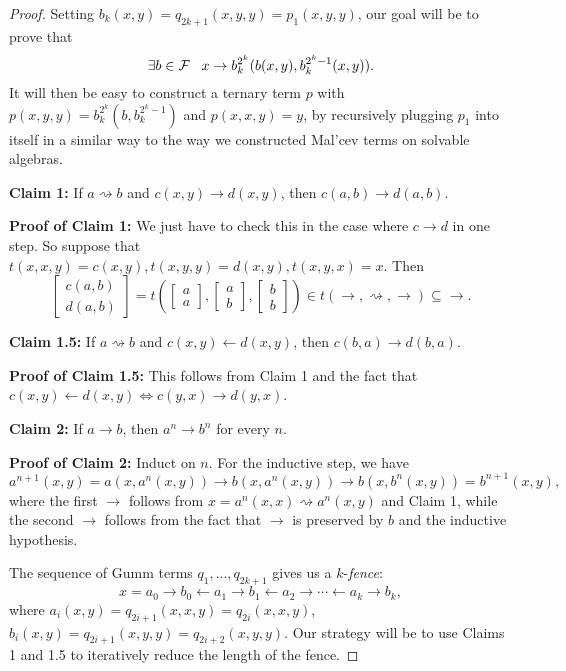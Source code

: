 \documentclass[letterpaper,11pt]{article}
\begin{document}
\begin{proof}
Setting $b_k(x,y) = q_{2k+1}(x,y,y) = p_1(x,y,y)$, our goal will be to prove that
\[
\exists b \in \mathcal{F}\;\;\; x \rightarrow b_k^{2^k}(b(x,y),b_k^{2^k-1}(x,y)).
\]
It will then be easy to construct a ternary term $p$ with $p(x,y,y) = b_k^{2^k}(b,b_k^{2^k-1})$ and $p(x,x,y) = y$, by recursively plugging $p_1$ into itself in a similar way to the way we constructed Mal'cev terms on solvable algebras.

{\bf Claim 1:} If $a \rightsquigarrow b$ and $c(x,y) \rightarrow d(x,y)$, then $c(a,b) \rightarrow d(a,b)$.

{\bf Proof of Claim 1:} We just have to check this in the case where $c \rightarrow d$ in one step. So suppose that $t(x,x,y) = c(x,y), t(x,y,y) = d(x,y), t(x,y,x) = x$. Then
\[
\begin{bmatrix} c(a,b)\\ d(a,b)\end{bmatrix} = t\left(\begin{bmatrix} a\\ a\end{bmatrix}, \begin{bmatrix} a\\ b\end{bmatrix}, \begin{bmatrix} b\\ b\end{bmatrix}\right) \in t(\rightarrow,\rightsquigarrow,\rightarrow) \subseteq \rightarrow.
\]

{\bf Claim 1.5:} If $a \rightsquigarrow b$ and $c(x,y) \leftarrow d(x,y)$, then $c(b,a) \rightarrow d(b,a)$.

{\bf Proof of Claim 1.5:} This follows from Claim 1 and the fact that $c(x,y) \leftarrow d(x,y) \iff c(y,x) \rightarrow d(y,x)$.

{\bf Claim 2:} If $a \rightarrow b$, then $a^n \rightarrow b^n$ for every $n$.

{\bf Proof of Claim 2:} Induct on $n$. For the inductive step, we have
\[
a^{n+1}(x,y) = a(x,a^n(x,y)) \rightarrow b(x,a^n(x,y)) \rightarrow b(x,b^n(x,y)) = b^{n+1}(x,y),
\]
where the first $\rightarrow$ follows from $x = a^n(x,x) \rightsquigarrow a^n(x,y)$ and Claim 1, while the second $\rightarrow$ follows from the fact that $\rightarrow$ is preserved by $b$ and the inductive hypothesis.

The sequence of Gumm terms $q_1, ..., q_{2k+1}$ gives us a $k$-\emph{fence}:
\[
x = a_0 \rightarrow b_0 \leftarrow a_1 \rightarrow b_1 \leftarrow a_2 \rightarrow \cdots \leftarrow a_k \rightarrow b_k,
\]
where $a_i(x,y) = q_{2i+1}(x,x,y) = q_{2i}(x,x,y)$, $b_i(x,y) = q_{2i+1}(x,y,y) = q_{2i+2}(x,y,y)$. Our strategy will be to use Claims 1 and 1.5 to iteratively reduce the length of the fence.


\end{proof}
\end{document}
